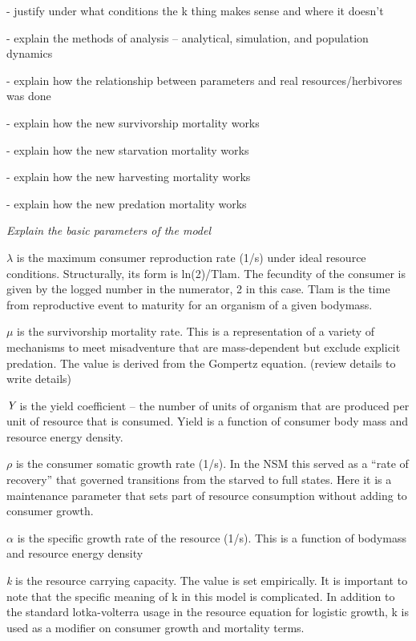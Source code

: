 \documentclass[]{rsos}%
\begin{document}
- justify under what conditions the k thing makes sense and where it doesn’t

- explain the methods of analysis – analytical, simulation, and population dynamics

- explain how the relationship between parameters and real resources/herbivores was done

- explain how the new survivorship mortality works

- explain how the new starvation mortality works

- explain how the new harvesting mortality works

- explain how the new predation mortality works

\vspace{0.5cm}

\emph{Explain the basic parameters of the model}

$\lambda$ is the maximum consumer reproduction rate (1/s) under ideal resource conditions. Structurally, its form is ln(2)/Tlam. The fecundity of the consumer is given by the logged number in the numerator, 2 in this case. Tlam is the time from reproductive event to maturity for an organism of a given bodymass. 


$\mu$ is the survivorship mortality rate. This is a representation of a variety of mechanisms to meet misadventure that are mass-dependent but exclude explicit predation. The value is derived from the Gompertz equation. (review details to write details)

$\emph{Y}$ is the yield coefficient – the number of units of organism that are produced per unit of resource that is consumed. Yield is a function of consumer body mass and resource energy density.

$\rho$ is the consumer somatic growth rate (1/s). In the NSM this served as a “rate of recovery” that governed transitions from the starved to full states. Here it is a maintenance parameter that sets part of  resource consumption without adding to consumer growth. 

$\alpha$ is the specific growth rate of the resource (1/s). This is a function of bodymass and resource energy density

\emph{k} is the resource carrying capacity. The value is set empirically. It is important to note that the specific meaning of k in this model is complicated. In addition to the standard lotka-volterra usage in the resource equation for logistic growth, k is used as a modifier on consumer growth and mortality terms.
\end{document}
